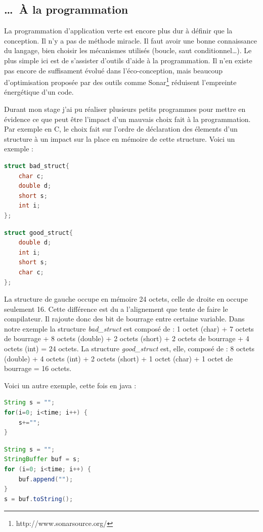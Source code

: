 \documentclass[a4paper, 11pt]{report}
\begin{document}
		\subsection{\ldots~À la programmation}
La programmation d'application \og verte \fg est encore plus dur à définir que la conception. Il n'y a pas de méthode miracle. Il faut avoir une bonne connaissance du langage, bien choisir les mécanismes utilisés (boucle, saut conditionnel\ldots). Le plus simple ici est de s'assister d'outils d'aide à la programmation. Il n'en existe pas encore de suffisament évolué dans l'éco-conception, mais beaucoup d'optimisation proposée par des outils comme Sonar\footnote{http://www.sonarsource.org/} réduisent l'empreinte énergétique d'un code.

Durant mon stage j'ai pu réaliser plusieurs petits programmes pour mettre en évidence ce que peut être l'impact d'un mauvais choix fait à la programmation. Par exemple en C, le choix fait sur l'ordre de déclaration des élements d'un structure à un impact sur la place en mémoire de cette structure. Voici un exemple :

\begin{multicols}{2}
\begin{lstlisting}[language=C]
struct bad_struct{
    char c;
    double d;
    short s;
    int i;
};
\end{lstlisting}
\columnbreak
\begin{lstlisting}[language=C]
struct good_struct{
    double d;
    int i;
    short s;
    char c;
};
\end{lstlisting}
\end{multicols}

La structure de gauche occupe en mémoire 24 octets, celle de droite en occupe seulement 16. Cette différence est du a l'alignement que tente de faire le compilateur. Il rajoute donc des bit de bourrage entre certaine variable. Dans notre exemple la structure \textit{bad\_struct} est composé de : 1 octet (char) + 7 octets de bourrage + 8 octets (double) + 2 octets (short) + 2 octets de bourrage + 4 octets (int) = 24 octets. La structure \textit{good\_struct} est, elle, composé de : 8 octets (double) + 4 octets (int) + 2 octets (short) + 1 octet (char) + 1 octet de bourrage = 16 octets.

Voici un autre exemple, cette fois en java :

\begin{multicols}{2}
\begin{lstlisting}[language=Java]
String s = "";
for(i=0; i<time; i++) {
    s+="";
}
\end{lstlisting}
\columnbreak
\begin{lstlisting}[language=Java]
String s = "";
StringBuffer buf = s;
for (i=0; i<time; i++) {
    buf.append("");
}
s = buf.toString();
\end{lstlisting}
\end{multicols}
\end{document}
